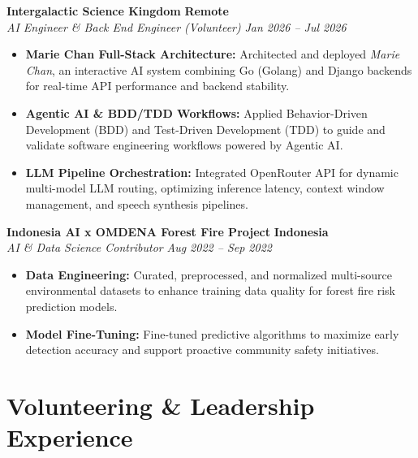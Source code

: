 \documentclass[letterpaper,10pt]{article}
\begin{document}
\noindent \textbf{\large Intergalactic Science Kingdom} \hfill \textbf{Remote} \\
\textit{AI Engineer \& Back End Engineer (Volunteer)} \hfill \textit{Jan 2026 -- Jul 2026}
\begin{itemize}
    \item \textbf{Marie Chan Full-Stack Architecture:} Architected and deployed \textit{Marie Chan}, an interactive AI system combining Go (Golang) and Django backends for real-time API performance and backend stability.
    \item \textbf{Agentic AI \& BDD/TDD Workflows:} Applied Behavior-Driven Development (BDD) and Test-Driven Development (TDD) to guide and validate software engineering workflows powered by Agentic AI.
    \item \textbf{LLM Pipeline Orchestration:} Integrated OpenRouter API for dynamic multi-model LLM routing, optimizing inference latency, context window management, and speech synthesis pipelines.
\end{itemize}
\vspace{2pt}

\noindent \textbf{\large Indonesia AI x OMDENA Forest Fire Project} \hfill \textbf{Indonesia} \\
\textit{AI \& Data Science Contributor} \hfill \textit{Aug 2022 -- Sep 2022}
\begin{itemize}
    \item \textbf{Data Engineering:} Curated, preprocessed, and normalized multi-source environmental datasets to enhance training data quality for forest fire risk prediction models.
    \item \textbf{Model Fine-Tuning:} Fine-tuned predictive algorithms to maximize early detection accuracy and support proactive community safety initiatives.
\end{itemize}

\newpage

\section{Volunteering \& Leadership Experience}
\vspace{1pt}
\end{document}
